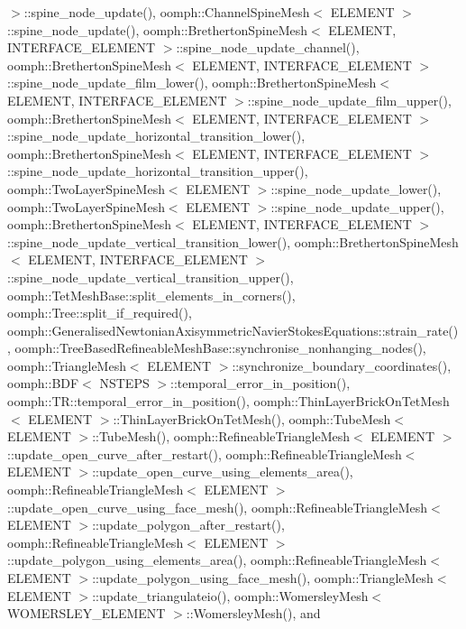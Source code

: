 $>$\+::spine\+\_\+node\+\_\+update(), oomph\+::\+Channel\+Spine\+Mesh$<$ E\+L\+E\+M\+E\+N\+T $>$\+::spine\+\_\+node\+\_\+update(), oomph\+::\+Bretherton\+Spine\+Mesh$<$ E\+L\+E\+M\+E\+N\+T, I\+N\+T\+E\+R\+F\+A\+C\+E\+\_\+\+E\+L\+E\+M\+E\+N\+T $>$\+::spine\+\_\+node\+\_\+update\+\_\+channel(), oomph\+::\+Bretherton\+Spine\+Mesh$<$ E\+L\+E\+M\+E\+N\+T, I\+N\+T\+E\+R\+F\+A\+C\+E\+\_\+\+E\+L\+E\+M\+E\+N\+T $>$\+::spine\+\_\+node\+\_\+update\+\_\+film\+\_\+lower(), oomph\+::\+Bretherton\+Spine\+Mesh$<$ E\+L\+E\+M\+E\+N\+T, I\+N\+T\+E\+R\+F\+A\+C\+E\+\_\+\+E\+L\+E\+M\+E\+N\+T $>$\+::spine\+\_\+node\+\_\+update\+\_\+film\+\_\+upper(), oomph\+::\+Bretherton\+Spine\+Mesh$<$ E\+L\+E\+M\+E\+N\+T, I\+N\+T\+E\+R\+F\+A\+C\+E\+\_\+\+E\+L\+E\+M\+E\+N\+T $>$\+::spine\+\_\+node\+\_\+update\+\_\+horizontal\+\_\+transition\+\_\+lower(), oomph\+::\+Bretherton\+Spine\+Mesh$<$ E\+L\+E\+M\+E\+N\+T, I\+N\+T\+E\+R\+F\+A\+C\+E\+\_\+\+E\+L\+E\+M\+E\+N\+T $>$\+::spine\+\_\+node\+\_\+update\+\_\+horizontal\+\_\+transition\+\_\+upper(), oomph\+::\+Two\+Layer\+Spine\+Mesh$<$ E\+L\+E\+M\+E\+N\+T $>$\+::spine\+\_\+node\+\_\+update\+\_\+lower(), oomph\+::\+Two\+Layer\+Spine\+Mesh$<$ E\+L\+E\+M\+E\+N\+T $>$\+::spine\+\_\+node\+\_\+update\+\_\+upper(), oomph\+::\+Bretherton\+Spine\+Mesh$<$ E\+L\+E\+M\+E\+N\+T, I\+N\+T\+E\+R\+F\+A\+C\+E\+\_\+\+E\+L\+E\+M\+E\+N\+T $>$\+::spine\+\_\+node\+\_\+update\+\_\+vertical\+\_\+transition\+\_\+lower(), oomph\+::\+Bretherton\+Spine\+Mesh$<$ E\+L\+E\+M\+E\+N\+T, I\+N\+T\+E\+R\+F\+A\+C\+E\+\_\+\+E\+L\+E\+M\+E\+N\+T $>$\+::spine\+\_\+node\+\_\+update\+\_\+vertical\+\_\+transition\+\_\+upper(), oomph\+::\+Tet\+Mesh\+Base\+::split\+\_\+elements\+\_\+in\+\_\+corners(), oomph\+::\+Tree\+::split\+\_\+if\+\_\+required(), oomph\+::\+Generalised\+Newtonian\+Axisymmetric\+Navier\+Stokes\+Equations\+::strain\+\_\+rate(), oomph\+::\+Tree\+Based\+Refineable\+Mesh\+Base\+::synchronise\+\_\+nonhanging\+\_\+nodes(), oomph\+::\+Triangle\+Mesh$<$ E\+L\+E\+M\+E\+N\+T $>$\+::synchronize\+\_\+boundary\+\_\+coordinates(), oomph\+::\+B\+D\+F$<$ N\+S\+T\+E\+P\+S $>$\+::temporal\+\_\+error\+\_\+in\+\_\+position(), oomph\+::\+T\+R\+::temporal\+\_\+error\+\_\+in\+\_\+position(), oomph\+::\+Thin\+Layer\+Brick\+On\+Tet\+Mesh$<$ E\+L\+E\+M\+E\+N\+T $>$\+::\+Thin\+Layer\+Brick\+On\+Tet\+Mesh(), oomph\+::\+Tube\+Mesh$<$ E\+L\+E\+M\+E\+N\+T $>$\+::\+Tube\+Mesh(), oomph\+::\+Refineable\+Triangle\+Mesh$<$ E\+L\+E\+M\+E\+N\+T $>$\+::update\+\_\+open\+\_\+curve\+\_\+after\+\_\+restart(), oomph\+::\+Refineable\+Triangle\+Mesh$<$ E\+L\+E\+M\+E\+N\+T $>$\+::update\+\_\+open\+\_\+curve\+\_\+using\+\_\+elements\+\_\+area(), oomph\+::\+Refineable\+Triangle\+Mesh$<$ E\+L\+E\+M\+E\+N\+T $>$\+::update\+\_\+open\+\_\+curve\+\_\+using\+\_\+face\+\_\+mesh(), oomph\+::\+Refineable\+Triangle\+Mesh$<$ E\+L\+E\+M\+E\+N\+T $>$\+::update\+\_\+polygon\+\_\+after\+\_\+restart(), oomph\+::\+Refineable\+Triangle\+Mesh$<$ E\+L\+E\+M\+E\+N\+T $>$\+::update\+\_\+polygon\+\_\+using\+\_\+elements\+\_\+area(), oomph\+::\+Refineable\+Triangle\+Mesh$<$ E\+L\+E\+M\+E\+N\+T $>$\+::update\+\_\+polygon\+\_\+using\+\_\+face\+\_\+mesh(), oomph\+::\+Triangle\+Mesh$<$ E\+L\+E\+M\+E\+N\+T $>$\+::update\+\_\+triangulateio(), oomph\+::\+Womersley\+Mesh$<$ W\+O\+M\+E\+R\+S\+L\+E\+Y\+\_\+\+E\+L\+E\+M\+E\+N\+T $>$\+::\+Womersley\+Mesh(), and 